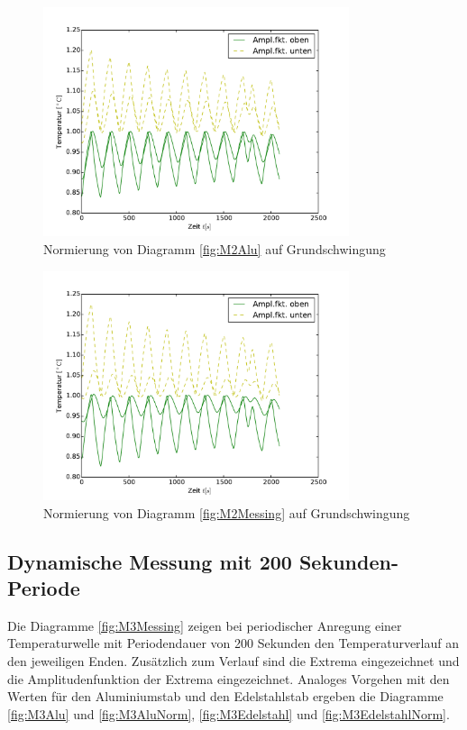 \begin{figure}[htp]
	\label{fig:M2MessingNorm}
	\centering
	\includegraphics[width=0.8\textwidth]{Bilder/Normierungsauswahl/M2_Alu_norm.pdf}
	\caption{Normierung von Diagramm \ref{fig:M2Alu} auf Grundschwingung}
\end{figure}
\begin{figure}[htp]
	\label{fig:M2AluNorm}
	\centering
	\includegraphics[width=0.8\textwidth]{Bilder/Normierungsauswahl/M2_Messing_norm.pdf}
	\caption{Normierung von Diagramm \ref{fig:M2Messing} auf Grundschwingung}
\end{figure}
\subsection{Dynamische Messung mit 200 Sekunden-Periode}
Die Diagramme \ref{fig:M3Messing} zeigen bei periodischer Anregung einer Temperaturwelle mit Periodendauer von 200 Sekunden den Temperaturverlauf an den jeweiligen Enden. 
Zusätzlich zum Verlauf sind die Extrema eingezeichnet und die Amplitudenfunktion der Extrema eingezeichnet. 
Analoges Vorgehen mit den Werten für den Aluminiumstab und den Edelstahlstab ergeben die Diagramme \ref{fig:M3Alu} und \ref{fig:M3AluNorm}, \ref{fig:M3Edelstahl} und \ref{fig:M3EdelstahlNorm}.

